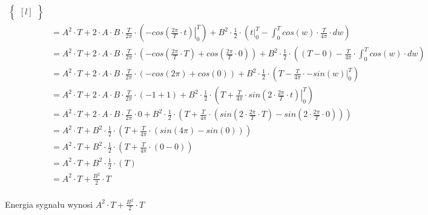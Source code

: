 \begin{align*}
\begin{Bmatrix*}[l]
 \end{Bmatrix*}\\
 &=A^2 \cdot T + 2\cdot A \cdot B \cdot \frac{T}{2\pi} \cdot \left( \left.-cos\left(\frac{2\pi}{T} \cdot t \right)\right|_{0}^{T}  \right) + B^2 \cdot \frac{1}{2}\cdot \left( \left. t \right|_{0}^{T} - \int_{0}^{T} cos\left(w \right)  \cdot \frac{T}{4\pi} \cdot dw \right)\\
 &=A^2 \cdot T + 2\cdot A \cdot B \cdot \frac{T}{2\pi} \cdot  \left(-cos\left(\frac{2\pi}{T} \cdot T \right)+cos\left(\frac{2\pi}{T} \cdot 0 \right)\right) + B^2 \cdot \frac{1}{2} \cdot \left( \left(T - 0 \right) - \frac{T}{4\pi} \cdot \int_{0}^{T} cos\left(w \right)  \cdot dw \right)\\
 &=A^2 \cdot T + 2\cdot A \cdot B \cdot \frac{T}{2\pi} \cdot  \left(-cos\left(2\pi \right)+cos\left(0 \right)\right) + B^2 \cdot \frac{1}{2} \cdot \left( T - \frac{T}{4\pi} \cdot \left. -sin\left(w \right)  \right|_{0}^{T} \right)\\
 &=A^2 \cdot T + 2\cdot A \cdot B \cdot \frac{T}{2\pi} \cdot  \left(-1+1\right) + B^2 \cdot \frac{1}{2} \cdot \left( T + \frac{T}{4\pi} \cdot \left. sin\left(2\cdot \frac{2\pi}{T}\cdot t \right)  \right|_{0}^{T} \right)\\
 &=A^2 \cdot T + 2\cdot A \cdot B \cdot \frac{T}{2\pi} \cdot 0 + B^2 \cdot \frac{1}{2} \cdot \left( T + \frac{T}{4\pi} \cdot \left( sin\left(2\cdot \frac{2\pi}{T}\cdot T \right) - sin\left(2\cdot \frac{2\pi}{T}\cdot 0 \right) \right) \right)\\
 &=A^2 \cdot T + B^2 \cdot \frac{1}{2} \cdot \left( T + \frac{T}{4\pi} \cdot \left( sin\left(4\pi \right) - sin\left( 0 \right) \right) \right)\\
 &=A^2 \cdot T + B^2 \cdot \frac{1}{2} \cdot \left( T + \frac{T}{4\pi} \cdot \left( 0 - 0 \right) \right)\\
 &=A^2 \cdot T + B^2 \cdot \frac{1}{2} \cdot \left( T \right)\\
 &=A^2 \cdot T + \frac{B^2}{2} \cdot T\\
\end{align*}

Energia sygnału wynosi $A^2 \cdot T + \frac{B^2}{2} \cdot T$
\newpage
